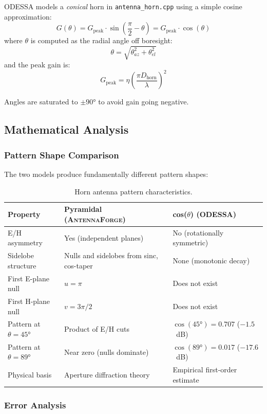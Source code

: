 \documentclass[11pt,a4paper]{article}
\newcommand{\AF}{\textsc{AntennaForge}}
\newcommand{\OD}{\textsc{ODESSA}}
\begin{document}
\OD{} models a \emph{conical} horn in \texttt{antenna\_horn.cpp} using a
simple cosine approximation:
\begin{equation}
  G(\theta) = G_{\text{peak}} \cdot \sin\!\left(\frac{\pi}{2} - \theta\right)
            = G_{\text{peak}} \cdot \cos(\theta)
\end{equation}
where $\theta$ is computed as the radial angle off boresight:
\[
  \theta = \sqrt{\theta_{az}^2 + \theta_{el}^2}
\]
and the peak gain is:
\[
  G_{\text{peak}} = \eta \left(\frac{\pi D_{\text{horn}}}{\lambda}\right)^2
\]

Angles are saturated to $\pm 90°$ to avoid gain going negative.

\subsection{Mathematical Analysis}

\subsubsection{Pattern Shape Comparison}

The two models produce fundamentally different pattern shapes:

\begin{table}[H]
\centering
\caption{Horn antenna pattern characteristics.}
\small
\begin{tabularx}{\textwidth}{l X X}
\toprule
\textbf{Property} & \textbf{Pyramidal (\AF{})} & \textbf{cos($\theta$) (\OD{})} \\
\midrule
E/H asymmetry & Yes (independent planes) & No (rotationally symmetric) \\
Sidelobe structure & Nulls and sidelobes from sinc, cos-taper & None (monotonic decay) \\
First E-plane null & $u = \pi$ & Does not exist \\
First H-plane null & $v = 3\pi/2$ & Does not exist \\
Pattern at $\theta = 45°$ & Product of E/H cuts & $\cos(45°) = 0.707$ ($-1.5$~dB) \\
Pattern at $\theta = 89°$ & Near zero (nulls dominate) & $\cos(89°) = 0.017$ ($-17.6$~dB) \\
Physical basis & Aperture diffraction theory & Empirical first-order estimate \\
\bottomrule
\end{tabularx}
\end{table}

\subsubsection{Error Analysis}
\end{document}
